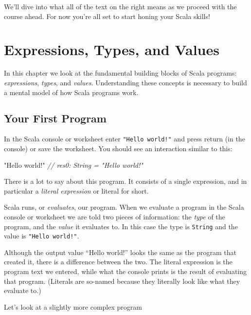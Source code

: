\documentclass[11pt,a5paper,]{book}
\newenvironment{Shaded}{\begin{snugshade}}{\end{snugshade}}
\newcommand{\CommentTok}[1]{\textcolor[rgb]{0.56,0.35,0.01}{\textit{#1}}}
\newcommand{\StringTok}[1]{\textcolor[rgb]{0.31,0.60,0.02}{#1}}
\begin{document}
We'll dive into what all of the text on the right means as we proceed
with the course ahead. For now you're all set to start honing your Scala
skills!

\hypertarget{expressions-types-and-values}{%
\chapter{Expressions, Types, and
Values}\label{expressions-types-and-values}}

In this chapter we look at the fundamental building blocks of Scala
programs: \emph{expressions}, \emph{types}, and \emph{values}.
Understanding these concepts is necessary to build a mental model of how
Scala programs work.

\hypertarget{your-first-program}{%
\section{Your First Program}\label{your-first-program}}

In the Scala console or worksheet enter \texttt{"Hello\ world!"} and
press return (in the console) or save the worksheet. You should see an
interaction similar to this:

\begin{Shaded}
\begin{Highlighting}[]
\StringTok{"Hello world!"}
\CommentTok{// res0: String = "Hello world!"}
\end{Highlighting}
\end{Shaded}

There is a lot to say about this program. It consists of a single
expression, and in particular a \emph{literal expression} or literal for
short.

Scala runs, or \emph{evaluates}, our program. When we evaluate a program
in the Scala console or worksheet we are told two pieces of information:
the \emph{type} of the program, and the \emph{value} it evaluates to. In
this case the type is \texttt{String} and the value is
\texttt{"Hello\ world!"}.

Although the output value ``Hello world!'' looks the same as the program
that created it, there is a difference between the two. The literal
expression is the program text we entered, while what the console prints
is the result of evaluating that program. (Literals are so-named because
they literally look like what they evaluate to.)

Let's look at a slightly more complex program
\end{document}
